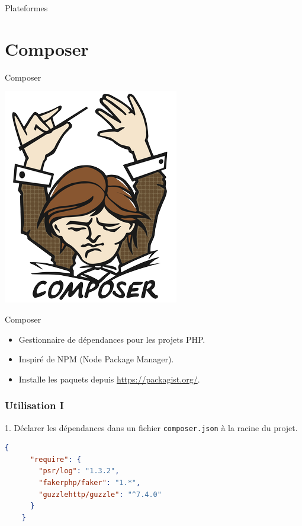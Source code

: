 \documentclass{beamer}
\begin{document}
\begin{frame}{Plateformes}
\begin{itemize}
\end{itemize}
\end{frame}

\section{Composer}
\begin{frame}{Composer}
\begin{center}
  \includegraphics[scale=1.5]{images/composer.png}
\end{center}
\end{frame}

\begin{frame}{Composer}
\begin{itemize}
  \item Gestionnaire de dépendances pour les projets PHP.
  \item Inspiré de NPM (Node Package Manager).
  \item Installe les paquets depuis \url{https://packagist.org/}.
\end{itemize}
\end{frame}

\begin{frame}[fragile]
\frametitle{Utilisation I}
  1. Déclarer les dépendances dans un fichier \texttt{composer.json} à la racine du projet.
  \begin{lstlisting}[language=json]
    {
      "require": {
        "psr/log": "1.3.2",
        "fakerphp/faker": "1.*",
        "guzzlehttp/guzzle": "^7.4.0"
      }
    }
  \end{lstlisting}
\end{frame}
\end{document}
